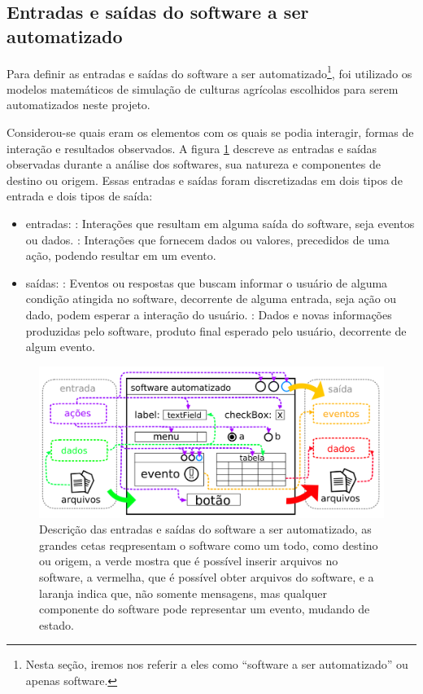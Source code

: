 \documentclass[tg]{mdtufsm}
\begin{document}
            \subsection{Entradas e saídas do software a ser automatizado}

                Para definir as entradas e saídas do software a ser automatizado\footnote{Nesta seção, iremos nos referir a eles como “software a ser automatizado” ou apenas software.}, foi utilizado os modelos matemáticos de simulação de culturas agrícolas escolhidos para serem automatizados neste projeto.

                Considerou-se quais eram os elementos com os quais se podia interagir, formas de interação e resultados observados. A figura \ref{fig:modelIO} descreve as entradas e saídas observadas durante a análise dos softwares, sua natureza e componentes de destino ou origem. Essas entradas e saídas foram discretizadas em dois tipos de entrada e dois tipos de saída:

                \begin{itemize}
                    \item entradas:
                        : Interações que resultam em alguma saída do software, seja eventos ou dados.
                        : Interações que fornecem dados ou valores, precedidos de uma ação, podendo resultar em um evento.
                    \item saídas:
                        : Eventos ou respostas que buscam informar o usuário de alguma condição atingida no software, decorrente de alguma entrada, seja ação ou dado, podem esperar a interação do usuário.
                        : Dados e novas informações produzidas pelo software, produto final esperado pelo usuário, decorrente de algum evento.
                \end{itemize}

                \begin{figure}[!htb]
                    {\centering
                    \includegraphics[width=1.0\textwidth]{imagens/modelIO}
                    \caption{Descrição das entradas e saídas do software a ser automatizado, as grandes cetas reqpresentam o software como um todo, como destino ou origem, a verde mostra que é possível inserir arquivos no software, a vermelha, que é possível obter arquivos do software, e a laranja indica que, não somente mensagens, mas qualquer componente do software pode representar um evento, mudando de estado.}
                    \label{fig:modelIO}}
                \end{figure}
\end{document}
